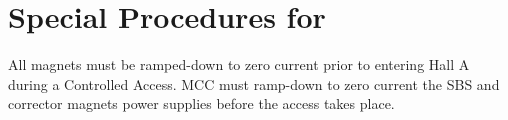 
%
%
\newpage
\section{Special Procedures for \HALL}
 All magnets must be ramped-down to zero current prior to entering Hall A during a Controlled Access.
MCC must ramp-down to zero current the SBS and corrector magnets power supplies before the access
takes place. 

%
%




 


%
%
